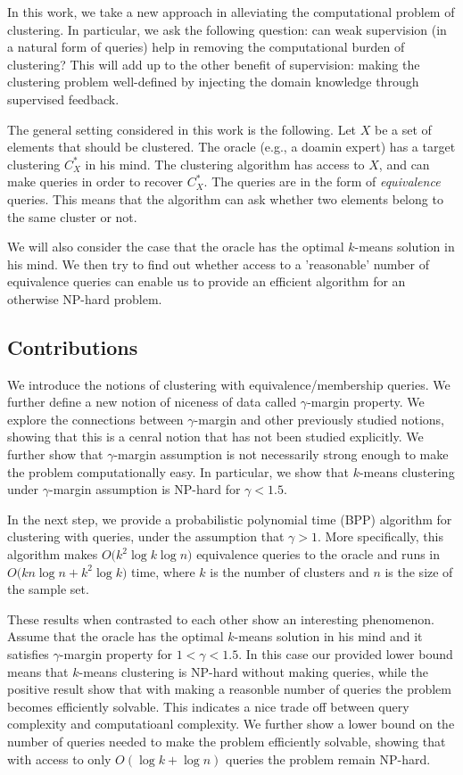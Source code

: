 \documentclass[orivec]{llncs}
\begin{document}
In this work, we take a new approach in alleviating the computational problem of clustering. In particular, we ask the following question: can weak supervision (in a natural form of queries) help in removing the computational burden of clustering? This will add up to the other benefit of supervision: making the clustering problem well-defined by injecting the domain knowledge through supervised feedback.

The general setting considered in this work is the following. Let $X$ be a set of elements that should be clustered. The oracle (e.g., a doamin expert) has a target clustering $C^*_X$ in his mind. The clustering algorithm has access to $X$, and can make queries in order to recover $C^*_X$. The queries are in the form of \emph{equivalence} queries. This means that the algorithm can ask whether two elements belong to the same cluster or not.

We will also consider the case that the oracle has the optimal $k$-means solution in his mind. We then try to find out whether access to a 'reasonable' number of equivalence queries can enable us to provide an efficient algorithm for an otherwise NP-hard problem. 

\subsection{Contributions}

We introduce the notions of clustering with equivalence/membership queries. We further define a new notion of niceness of data called $\gamma$-margin property. We explore the connections between $\gamma$-margin and other previously studied notions, showing that this is a cenral notion that has not been studied explicitly. We further show that $\gamma$-margin assumption is not necessarily strong enough to make the problem computationally easy. In particular, we show that $k$-means clustering under $\gamma$-margin assumption is NP-hard for $\gamma < 1.5$.

In the next step, we provide a probabilistic polynomial time (BPP) algorithm for clustering with queries, under the assumption that $\gamma > 1$. More specifically, this algorithm makes $O\big(k^2\log k\log n)$ equivalence queries to the oracle and runs in $O\big(kn\log n + k^2\log k)$ time, where $k$ is the number of clusters and $n$ is the size of the sample set.

These results when contrasted to each other show an interesting phenomenon. Assume that the oracle has the optimal $k$-means solution in his mind and it satisfies $\gamma$-margin property for $1<\gamma <1.5$. In this case our provided lower bound means that $k$-means clustering is NP-hard without making queries, while the positive result show that with making a reasonble number of queries the problem becomes efficiently solvable. This indicates a nice trade off between query complexity and computatioanl complexity. We further show a lower bound on the number of queries needed to make the problem efficiently solvable, showing that with access to only $O(\log k + \log n)$ queries the problem remain NP-hard.
\end{document}
